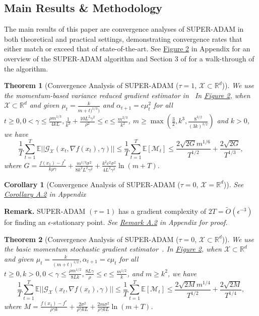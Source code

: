 \documentclass{article}
\newtheorem{theorem}{Theorem}[section]
\newtheorem{corollary}{Corollary}[section]
\begin{document}
\subsection{Main Results \& Methodology}
The main results of this paper are convergence analyses of SUPER-ADAM in both theoretical and practical settings, demonstrating convergence rates that either match or exceed that of state-of-the-art. See \hyperref[fig2]{Figure 2} in Appendix for an overview of the SUPER-ADAM algorithm and
Section 3 of \cite{https://doi.org/10.48550/arxiv.2106.08208} for a walk-through of the algorithm.
\begin{theorem}[Convergence Analysis of SUPER-ADAM ($\tau = 1$, $\mathcal{X}\subset\mathbb{R}^d$)]
	We use the momentum-based variance reduced gradient estimator in~\cite{https://doi.org/10.48550/arxiv.1905.10018, https://doi.org/10.48550/arxiv.1905.05920}
	In \hyperref[fig2]{Figure 2}, when $\mathcal{X}\subset\mathbb{R}^d$ and given $\mu_t = \frac{k}{m+t)^{1/3})}$ and $\alpha_{t+1}=c\mu^2_t$ for all $t\geq 0, 0 < \gamma \leq \frac{\rho m^{1/3}}{4kL}, \frac{1}{k^3} + \frac{10L^2 \gamma^2}{\rho^2}\leq c\leq \frac{m^{2/3}}{k^2}$,
	$m\geq\max\left(\frac{3}{2}, k^3, \frac{8^{3/2}}{(3k)^{3/2}}\right)$ and $k > 0$, we have
	\begin{equation}
		\label{eq61}
		\frac{1}{T}\sum^T_{t=1}\mathbb{E}||\mathcal{G}_{\mathcal{X}}(x_t, \nabla f(x_t), \gamma)||\leq
		\frac{1}{T}\sum^T_{t=1}\mathbb{E}[\mathcal{M}_t]\leq
		\frac{2\sqrt{2G}m^{1/6}}{T^{1/2}} + \frac{2\sqrt{2G}}{T^{1/3}},
	\end{equation}
	where $G = \frac{f(x_1) - f^*}{k\rho\gamma} + \frac{m^{1/3}\sigma^2}{8k^2 L^2 \gamma^2} + \frac{k^2 c^2 \sigma^2}{4L^2 \gamma^2}\ln(m+T)$.
\end{theorem}
\begin{corollary}[Convergence Analysis of SUPER-ADAM ($\tau = 0$, $\mathcal{X}=\mathbb{R}^d$)]
		See \hyperref[coro51appendix]{Corollary A.2} in Appendix
\end{corollary}
\textbf{Remark.} SUPER-ADAM $(\tau = 1)$ has a gradient complexity of $2T = \tilde{O}(\epsilon^{-3})$ for finding an $\epsilon$-stationary point. \textit{See \hyperref[rmka2]{Remark A.2} in Appendix for proof.}
\begin{theorem}[Convergence Analysis of SUPER-ADAM ($\tau = 0$, $\mathcal{X}\subset\mathbb{R}^d$)]
	We use the basic momentum stochastic gradient estimator~\cite{https://doi.org/10.48550/arxiv.1412.6980}.
	In \hyperref[fig2]{Figure 2}, when $\mathcal{X}\subset \mathbb{R}^d$ and given $\mu_t = \frac{k}{(m+t)^{1/2}}, \alpha_{t+1} = c\mu_t$ for all $t\geq 0, k > 0, 0 < \gamma \leq \frac{\rho m^{1/2}}{8Lk}, \frac{8L\gamma}{\rho}\leq c\leq \frac{m^{1/2}}{k}$,
	and $m\geq k^2$, we have
	\begin{equation}
		\frac{1}{T}\sum^T_{t=1}\mathbb{E}||\mathcal{G}_{\mathcal{X}}(x_t, \nabla f(x_t), \gamma)||\leq
		\frac{1}{T}\sum^T_{t=1}\mathbb{E}[\mathcal{M}_t]\leq
		\frac{2\sqrt{2M}m^{1/4}}{T^{1/2}} + \frac{2\sqrt{2M}}{T^{1/4}},
	\end{equation}
	where $M = \frac{f(x_1) - f^*}{\rho\gamma k} + \frac{2\sigma^2}{\rho\gamma kL} + \frac{2m\sigma^2}{\rho\gamma kL}\ln(m+T)$.
\end{theorem}
\end{document}
